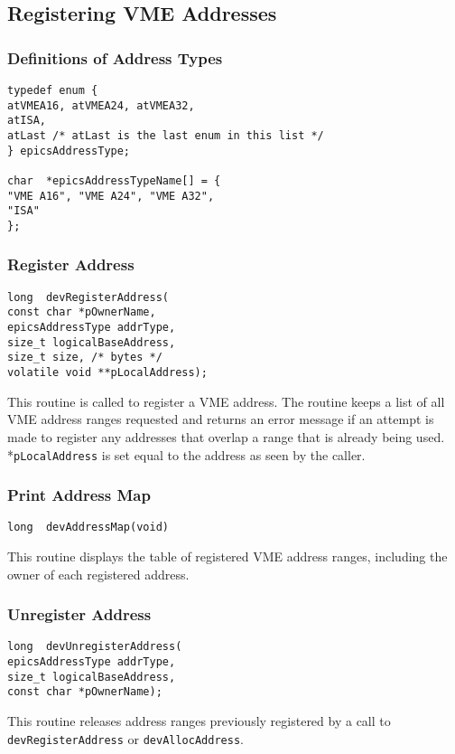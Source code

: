 \subsection{Registering VME Addresses}

\subsubsection{Definitions of Address Types}

\begin{verbatim}typedef enum {
atVMEA16, atVMEA24, atVMEA32,
atISA,
atLast /* atLast is the last enum in this list */
} epicsAddressType;

char  *epicsAddressTypeName[] = {
"VME A16", "VME A24", "VME A32",
"ISA"
};
\end{verbatim}
\subsubsection{Register Address}

\begin{verbatim}long  devRegisterAddress(
const char *pOwnerName,
epicsAddressType addrType,
size_t logicalBaseAddress,
size_t size, /* bytes */
volatile void **pLocalAddress);
\end{verbatim}This routine is called to register a VME address. The routine keeps a list of all VME address ranges requested and returns 
an error message if an attempt is made to register any addresses that overlap a range that is already being used. 
*\verb|pLocalAddress| is set equal to the address as seen by the caller.

\subsubsection{Print Address Map}

\begin{verbatim}long  devAddressMap(void)
\end{verbatim}This routine displays the table of registered VME address ranges, including the owner of each registered address.

\subsubsection{Unregister Address}

\begin{verbatim}long  devUnregisterAddress(
epicsAddressType addrType,
size_t logicalBaseAddress,
const char *pOwnerName);
\end{verbatim}This routine releases address ranges previously registered by a call to \verb|devRegisterAddress| or \verb|devAllocAddress|.

